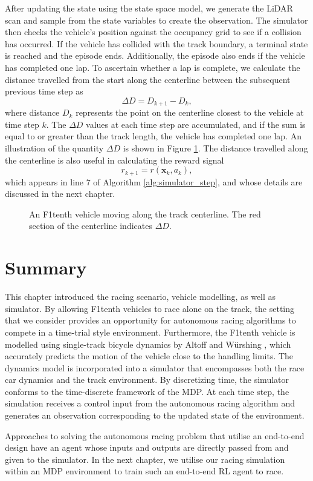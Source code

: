 After updating the state using the state space model, we generate the LiDAR scan and sample from the state variables to create the observation.
The simulator then checks the vehicle's position against the occupancy grid to see if a collision has occurred.
If the vehicle has collided with the track boundary, a terminal state is reached and the episode ends.
Additionally, the episode also ends if the vehicle has completed one lap.
To ascertain whether a lap is complete, we calculate the distance travelled from the start along the centerline between the subsequent previous time step as
\begin{equation}
    \Delta D = D_{k+1} - D_{k},
\end{equation}
where distance $D_k$ represents the point on the centerline closest to the vehicle at time step $k$.
The $\Delta D$ values at each time step are accumulated, and if the sum is equal to or greater than the track length, the vehicle has completed one lap.
An illustration of the quantity $\Delta D$ is shown in Figure \ref{fig:centerline_distance}.
The distance travelled along the centerline is also useful in calculating the reward signal
\begin{equation}
    r_{k+1} = r(\mathbf{x}_k, a_k),
\end{equation}
which appears in line 7 of Algorithm \ref{alg:simulator_step}, and whose details are discussed in the next chapter.
\begin{figure}[htb!]
    \centering
    
    \caption[A vehicle moving along the track centerline]{An F1tenth vehicle moving along the track centerline. The red section of the centerline indicates $\Delta D$.}
    \label{fig:centerline_distance}
\end{figure}


\section{Summary}

This chapter introduced the racing scenario, vehicle modelling, as well as simulator.
By allowing F1tenth vehicles to race alone on the track, the setting that we consider provides an opportunity for autonomous racing algorithms to compete in a time-trial style environment.
Furthermore, the F1tenth vehicle is modelled using single-track bicycle dynamics by Altoff and  W\"{u}rshing \cite{Althoff2020}, which accurately predicts the motion of the vehicle close to the handling limits.
The dynamics model is incorporated into a simulator that encompasses both the race car dynamics and the track environment. 
By discretizing time, the simulator conforms to the time-discrete framework of the MDP. 
At each time step, the simulation receives a control input from the autonomous racing algorithm and generates an observation corresponding to the updated state of the environment. 

Approaches to solving the autonomous racing problem that utilise an end-to-end design have an agent whose inputs and outputs
are directly passed from and given to the simulator.
In the next chapter, we utilise our racing simulation within an MDP environment to train such an end-to-end RL agent to race.